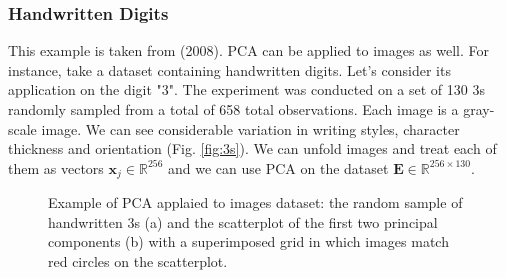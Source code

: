 \subsubsection{Handwritten Digits}
This example is taken from \citeauthor{tibshirani_elements_2008} (2008).
PCA can be applied to images as well. For instance, take a dataset containing handwritten digits. Let's consider its application on the digit "3". The experiment was conducted on a set of 130 3s randomly sampled from a total of 658 total observations. Each image is a  gray-scale image. We can see considerable variation in writing styles, character thickness and orientation (Fig. \ref{fig:3s}). We can unfold images and treat each of them as vectors $\textbf{x}_j \in \mathbb{R}^{256}$ and we can use PCA on the dataset $\mathbf{E}\in\mathbb{R}^{256\times 130}$.
\begin{figure}
    \centering
    \qquad
    \caption[Example of PCA of images.]{Example of PCA applaied to images dataset: the random sample of handwritten 3s (a) and the scatterplot of the first two principal components (b) with a superimposed grid in which images match red circles on the scatterplot\cite{tibshirani_elements_2008}.}
\end{figure}
